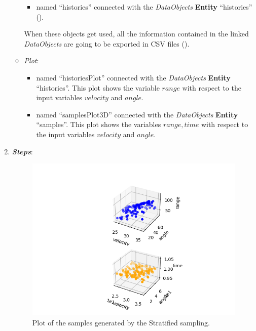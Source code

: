 \begin{enumerate}
\begin{itemize}
\begin{itemize}
       \item named ``histories'' connected with the \textit{DataObjects} \textbf{Entity} ``histories'' ().
     \end{itemize}
      When these objects get used, all the information contained in the
      linked  \textit{DataObjects} are going
    to be exported in CSV files ().
    \item \textit{Plot}:
    \begin{itemize}
      \item named ``historiesPlot'' connected with the  \textit{DataObjects}
      \textbf{Entity} ``histories''.  This plot shows the variable $range$ with respect to the input variables $velocity$ and $angle$.
      \item named ``samplesPlot3D'' connected with the
      \textit{DataObjects} \textbf{Entity} ``samples''. This plot shows the variables $range,time$ with respect to the input variables $velocity$ and $angle$.
    \end{itemize}
  \end{itemize}
   \item \textbf{\textit{Steps}}:
 \begin{figure}[h!]
  \centering
  \includegraphics[scale=0.7]{../../tests/framework/user_guide/ForwardSamplingStrategies/gold/RunDir/Stratified/1-samplesPlot3D_scatter-scatter.png}
  \caption{Plot of the samples generated by the Stratified sampling.}

\end{figure}
\end{enumerate}
